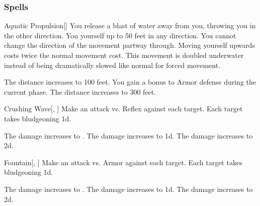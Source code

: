 \subsubsection{Spells}


\lowercase{\hypertarget{spell:Aquatic Propulsion}{}}\label{spell:Aquatic Propulsion}
\begin{freeability}[Rank 1]{\hypertarget{spell:Aquatic Propulsion}{Aquatic Propulsion}}[]
You release a blast of water away from you, throwing you in the other direction.
You  yourself up to 50 feet in any direction.
You cannot change the direction of the movement partway through.
Moving yourself upwards costs twice the normal movement cost.
This movement is doubled underwater instead of being dramatically slowed like normal for forced movement.

\rankline
{} The distance increases to 100 feet.
 You gain a  bonus to Armor defense during the current phase.
 The distance increases to 300 feet.
\end{freeability}
\vspace{0.25em}



\lowercase{\hypertarget{spell:Crushing Wave}{}}\label{spell:Crushing Wave}
\begin{freeability}[Rank 1]{\hypertarget{spell:Crushing Wave}{Crushing Wave}}[, ]
Make an attack vs. Reflex against each target.
\hit Each target takes bludgeoning  \minus1d.

\rankline
{} The damage increases to .
 The damage increases to  \plus1d.
 The damage increases to  \plus2d.
\end{freeability}
\vspace{0.25em}



\lowercase{\hypertarget{spell:Fountain}{}}\label{spell:Fountain}
\begin{freeability}[Rank 1]{\hypertarget{spell:Fountain}{Fountain}}[, ]
Make an attack vs. Armor against each target.
\hit Each target takes bludgeoning  \minus1d.

\rankline
{} The damage increases to .
 The damage increases to  \plus1d.
 The damage increases to  \plus2d.
\end{freeability}
\vspace{0.25em}



